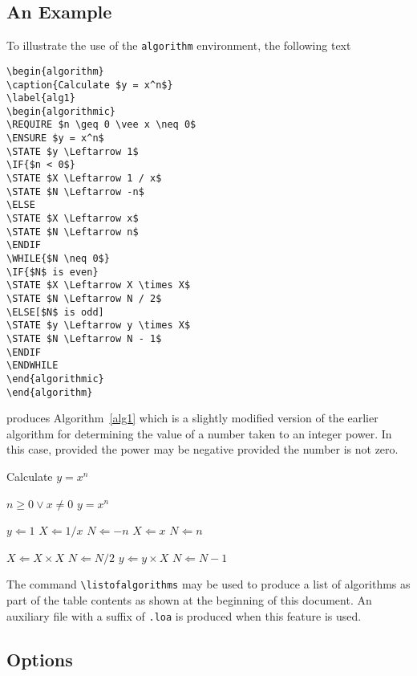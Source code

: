 \documentclass[letterpaper]{article}
\begin{document}
\subsection{An Example}
To illustrate the use of the \texttt{algorithm} environment, the
following text
\begin{verbatim}
\begin{algorithm}
\caption{Calculate $y = x^n$}
\label{alg1}
\begin{algorithmic}
\REQUIRE $n \geq 0 \vee x \neq 0$
\ENSURE $y = x^n$
\STATE $y \Leftarrow 1$
\IF{$n < 0$}
\STATE $X \Leftarrow 1 / x$
\STATE $N \Leftarrow -n$
\ELSE
\STATE $X \Leftarrow x$
\STATE $N \Leftarrow n$
\ENDIF
\WHILE{$N \neq 0$}
\IF{$N$ is even}
\STATE $X \Leftarrow X \times X$
\STATE $N \Leftarrow N / 2$
\ELSE[$N$ is odd]
\STATE $y \Leftarrow y \times X$
\STATE $N \Leftarrow N - 1$
\ENDIF
\ENDWHILE
\end{algorithmic}
\end{algorithm}
\end{verbatim}
produces Algorithm~\ref{alg1} which is a slightly modified version of
the earlier algorithm for determining the value of a number taken to an
integer power.  In this case, provided the power may be negative
provided the number is not zero.

\begin{algorithm}[H]
  \caption{Calculate $y = x^n$}
  \label{alg1}
  \begin{algorithmic}
    \REQUIRE $n \geq 0 \vee x \neq 0$
    \ENSURE $y = x^n$

    \STATE $y \Leftarrow 1$
       \STATE $X \Leftarrow 1 / x$
       \STATE $N \Leftarrow -n$
    \ELSE
       \STATE $X \Leftarrow x$
       \STATE $N \Leftarrow n$
    \ENDIF

        \STATE $X \Leftarrow X \times X$
        \STATE $N \Leftarrow N / 2$
      \ELSE[$N$ is odd]
        \STATE $y \Leftarrow y \times X$
        \STATE $N \Leftarrow N - 1$
      \ENDIF
    \ENDWHILE
  \end{algorithmic}
\end{algorithm}

The command \verb+\listofalgorithms+ may be used to produce a list of
algorithms as part of the table contents as shown at the beginning of
this document.  An auxiliary file with a suffix of \texttt{.loa} is
produced when this feature is used.

\subsection{Options}
\end{document}
